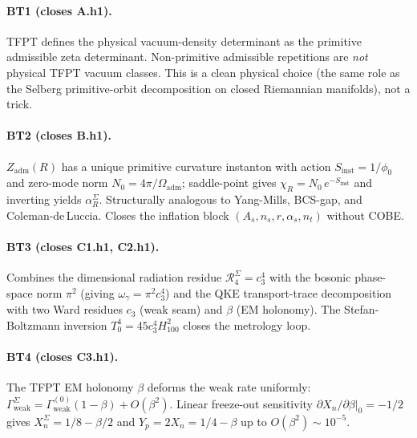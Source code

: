 \documentclass[11pt,a4paper]{article}
\begin{document}
\paragraph{BT1 (closes A.h1).}  TFPT defines the physical vacuum-density
determinant as the primitive admissible zeta determinant.
Non-primitive admissible repetitions are \emph{not} physical TFPT
vacuum classes.  This is a clean physical choice (the same role as
the Selberg primitive-orbit decomposition on closed Riemannian
manifolds), not a trick.

\paragraph{BT2 (closes B.h1).}  \(Z_{\mathrm{adm}}(R)\) has a unique
primitive curvature instanton with action \(S_{\mathrm{inst}}=1/\phi_0\)
and zero-mode norm \(N_0=4\pi/\Omega_{\mathrm{adm}}\); saddle-point
gives \(\chi_R=N_0\,e^{-S_{\mathrm{inst}}}\) and inverting yields
\(\alpha_R^\Sigma\).  Structurally analogous to Yang-Mills,
BCS-gap, and Coleman-de\,Luccia.  Closes the inflation block
\((A_s,n_s,r,\alpha_s,n_t)\) without COBE.

\paragraph{BT3 (closes C1.h1, C2.h1).}  Combines the dimensional
radiation residue \(\mathcal R_4^\Sigma=c_3^4\) with the bosonic
phase-space norm \(\pi^2\) (giving \(\omega_\gamma=\pi^2 c_3^4\)) and
the QKE transport-trace decomposition with two Ward residues
\(c_3\) (weak seam) and \(\beta\) (EM holonomy).  The Stefan-Boltzmann
inversion \(T_0^4=45 c_3^4 H_{100}^2\) closes the metrology loop.

\paragraph{BT4 (closes C3.h1).}  The TFPT EM holonomy \(\beta\)
deforms the weak rate uniformly: \(\Gamma_{\mathrm{weak}}^\Sigma=
\Gamma_{\mathrm{weak}}^{(0)}(1-\beta)+O(\beta^2)\).  Linear freeze-out
sensitivity \(\partial X_n/\partial\beta\bigr|_0=-1/2\) gives
\(X_n^\Sigma=1/8-\beta/2\) and \(Y_p=2X_n=1/4-\beta\) up to
\(O(\beta^2)\sim 10^{-5}\).
\end{document}
